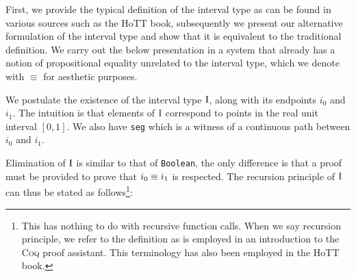 \documentclass[12pt,twoside,maitrise]{dms}
\theoremstyle{definition}
\numberwithin{equation}{section}
\numberwithin{table}{chapter}
\numberwithin{figure}{chapter}
\newcommand\kw[1] {\textsf{#1}}
\newcommand\id[1] {\texttt{#1}}
\def\Coq{\textsc{Coq}\xspace}
\begin{document}
First, we provide the typical definition of the interval type as can be found in
various sources such as the HoTT book\cite{HoTTbook}, subsequently we present
our alternative formulation of the interval type and show that it is equivalent
to the traditional definition. We carry out the below presentation in a system
that already has a notion of propositional equality unrelated to the interval
type, which we denote with $\equiv$ for aesthetic purposes.

\begin{prooftree*}
   \infer0{\oftype{\ctx}{\bI}{\kw{Type}}}
\end{prooftree*}

\begin{prooftree*}
\end{prooftree*}

\begin{prooftree*}
\end{prooftree*}

\begin{prooftree*}
\end{prooftree*}

We postulate the existence of the interval type $\mathrm{I}$, along with its endpoints
\id{$i_0$} and \id{$i_1$}. The intuition is that elements of $\mathrm{I}$ correspond to
points in the real unit interval $[0, 1]$. We also have \id{seg} which is a
witness of a continuous path between \id{$i_0$} and \id{$i_1$}.

Elimination of $\mathrm{I}$ is similar to that of \id{Boolean}, the only difference is
that a proof must be provided to prove that $\eqtype{i_0}{i_1}$ is respected.
The recursion principle of $\mathrm{I}$ can thus be stated as follows\footnote{This has
nothing to do with recursive function calls. When we say recursion principle, we
refer to the definition as is employed in an introduction to the \Coq{} proof
assistant\cite{chlipala2022certified}. This terminology has also been employed
in the HoTT book\cite{HoTTbook}.}:

\begin{prooftree*}
\end{prooftree*}
\end{document}
